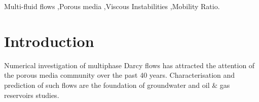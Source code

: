 \documentclass[preprint,authoryear,12pt]{elsarticle}
\begin{document}
\begin{frontmatter}
\begin{abstract}

  
\end{abstract}



\begin{keyword} %
 Multi-fluid flows \sep Porous media \sep Viscous Instabilities \sep Mobility Ratio.
\end{keyword}
 
\end{frontmatter}




\section{Introduction}\label{section:intro}
Numerical investigation of multiphase Darcy flows has attracted the attention of the porous media community over the past 40 years. Characterisation and prediction of such flows are the foundation of groundwater and oil $\&$ gas reservoirs studies.%
\end{document}
